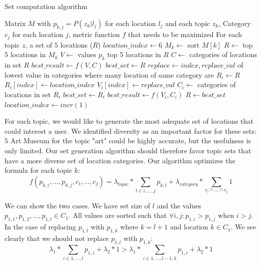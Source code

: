 \begin{algorithm}
\caption{Set computation algorithm}
\label{alg:set}
\begin{algorithmic}
  \REQUIRE Matrix $M$ with $p_{k,j} = P(z_k|l_j)$ for each location $l_j$ and each topic $z_k$, Category $c_j$ for each location $j$, metric function $f$ that needs to be maximized
  \ENSURE For each topic $z$, a set of $5$ locations ($R$)
  \STATE $location\_index \leftarrow 6$
  \STATE $M_k \leftarrow  $ sort $M[k]$
  \STATE $R \leftarrow $ top 5 locations in $M_k$
  \STATE $V \leftarrow $ values $p_{k}$ top 5 locations in $R$
  \STATE $C \leftarrow $ categories of locations in set $R$
  \STATE $best\_result \leftarrow f(V, C)$
  \STATE $best\_set \leftarrow R$
    \STATE $replace \leftarrow index, replace\_val$ of lowest value in categories where many location of same category are
      \STATE $R_i \leftarrow R$
      \STATE $R_i[index] \leftarrow location\_index$
      \STATE $V_i[index] \leftarrow replace\_val$
      \STATE $C_i \leftarrow$ categories of locations in set $R_i$
        \STATE $best\_set \leftarrow R_i$
        \STATE $best\_result \leftarrow f(V_i, C_i)$
      \ENDIF
    \ENDFOR
    \STATE $R \leftarrow best\_set$
    \STATE $location\_index \leftarrow incr(1)$
  \ENDWHILE
  \ENDFOR
\end{algorithmic}

\end{algorithm}

For each topic, we would like to generate the most adequate set of locations that could interest a user. We identified diversity as an important factor for these sets: $5$ Art Museum for the topic "art" could be highly accurate, but the usefulness is only limited. Our set generation algorithm should therefore favor topic sets that have a more diverse set of location categories. Our algorithm optimizes the formula for each topic $k$:
\[
  f(p_{k,i}, ..., p_{k,j}, c_i, ..., c_j) = \lambda_{topic} * \sum_{l \in i,...,j} {p_{k,l}} + \lambda_{category} * \sum_{c_i \cap ... \cap c_j} {1}
\]

We can show the two cases. We have set size of $l$ and the values $p_{1,1}, p_{1,2}, ..., p_{1,l} \in C_1$. All values are sorted such that $\forall i, j: p_{1,i} > p_{1,j}$ when $i > j$. In the case of replacing $p_{1,l}$ with $p_{1,k}$ where $k = l + 1$ and location $k \in C_1$. We see clearly that we should not replace $p_{1,l}$ with $p_{1,k}$:
\[
  \lambda_1 * \sum_{i \in 1,...,l} {p_{1,i}} + \lambda_2 * 1 > \lambda_1 * \sum_{i \in 1,...,l-1,k} {p_{1,i}} + \lambda_2 * 1
\]

